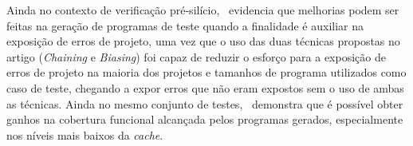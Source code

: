 Ainda no contexto de verificação pré-silício,~\cite{Andrade:2019} evidencia
que melhorias podem ser feitas na geração de programas de teste quando a
finalidade é auxiliar na exposição de erros de projeto, uma vez que o uso
das duas técnicas propostas no artigo (\textit{Chaining} e
\textit{Biasing}) foi capaz de reduzir o esforço para a exposição de erros
de projeto na maioria dos projetos e tamanhos de programa utilizados como
caso de teste, chegando a expor erros que não eram expostos sem o uso de
ambas as técnicas. Ainda no mesmo conjunto de testes,~\cite{Andrade:2019}
demonstra que é possível obter ganhos na cobertura funcional alcançada
pelos programas gerados, especialmente nos níveis mais baixos da
\textit{cache}.

